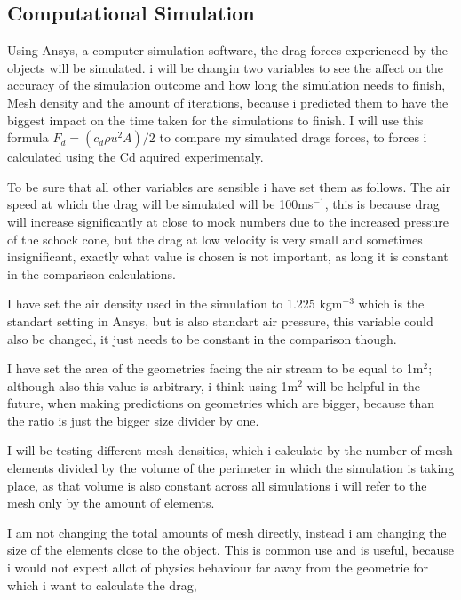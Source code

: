 \documentclass[12pt,a4paper]{article}
\begin{document}
\subsection{Computational Simulation}

Using Ansys, a computer simulation software, the drag forces experienced by the objects will be simulated. i will be changin two variables to see the affect on the accuracy of the simulation outcome and how long the simulation needs to finish, Mesh density and the amount of iterations, because i predicted them to have the biggest impact on the time taken for the simulations to finish. I will use this formula $F_d = (c_d \rho u^2 A)/2$ to compare my simulated drags forces, to forces i calculated using the Cd aquired experimentaly. 

To be sure that all other variables are sensible i have set them as follows. The air speed at which the drag will be simulated will be 100ms$^{-1}$, this is because drag will increase significantly at close to mock numbers due to the increased pressure of the schock cone, but the drag at low velocity is very small and sometimes insignificant, exactly what value is chosen is not important, as long it is constant in the comparison calculations. 

I have set the air density used in the simulation to 1.225 kgm$^{-3}$ which is the standart setting in Ansys, but is also standart air pressure, this variable could also be changed, it just needs to be constant in the comparison though.

 I have set the area of the geometries facing the air stream to be equal to 1m$^2$; although also this value is arbitrary, i think using 1m$^2$ will be helpful in the future, when making predictions on geometries which are bigger, because than the ratio is just the bigger size divider by one. 

I will be testing different mesh densities, which i calculate by the number of mesh elements divided by the volume of the perimeter in which the simulation is taking place, as that volume is also constant across all simulations i will refer to the mesh only by the amount of elements.

I am not changing the total amounts of mesh directly, instead i am changing the size of the elements close to the object. This is common use and is useful, because i would not expect allot of physics behaviour far away from the geometrie for which i want to calculate the drag, 
\end{document}
